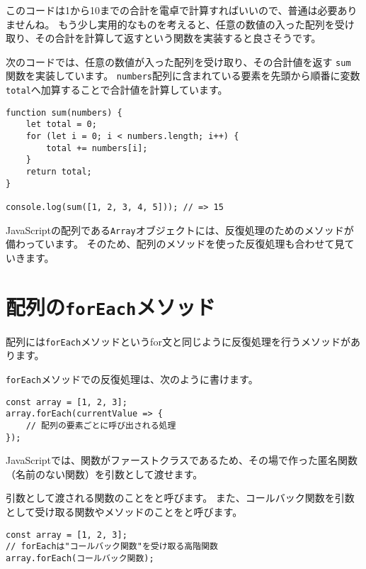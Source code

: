 このコードは1から10までの合計を電卓で計算すればいいので、普通は必要ありませんね。
もう少し実用的なものを考えると、任意の数値の入った配列を受け取り、その合計を計算して返すという関数を実装すると良さそうです。

次のコードでは、任意の数値が入った配列を受け取り、その合計値を返す
\texttt{sum} 関数を実装しています。
\texttt{numbers}配列に含まれている要素を先頭から順番に変数\texttt{total}へ加算することで合計値を計算しています。

\begin{lstlisting}
function sum(numbers) {
    let total = 0;
    for (let i = 0; i < numbers.length; i++) {
        total += numbers[i];
    }
    return total;
}

console.log(sum([1, 2, 3, 4, 5])); // => 15
\end{lstlisting}

JavaScriptの配列である\texttt{Array}オブジェクトには、反復処理のためのメソッドが備わっています。
そのため、配列のメソッドを使った反復処理も合わせて見ていきます。

\hypertarget{array-foreach}{%
\section{\texorpdfstring{配列の\texttt{forEach}メソッド}{配列のforEachメソッド}}\label{array-foreach}}

配列には\texttt{forEach}メソッドというfor文と同じように反復処理を行うメソッドがあります。

\texttt{forEach}メソッドでの反復処理は、次のように書けます。

\begin{lstlisting}
const array = [1, 2, 3];
array.forEach(currentValue => {
    // 配列の要素ごとに呼び出される処理
});
\end{lstlisting}

JavaScriptでは、関数がファーストクラスであるため、その場で作った匿名関数（名前のない関数）を引数として渡せます。

引数として渡される関数のことを\textbf{}と呼びます。
また、コールバック関数を引数として受け取る関数やメソッドのことを\textbf{}と呼びます。

\begin{lstlisting}
const array = [1, 2, 3];
// forEachは"コールバック関数"を受け取る高階関数
array.forEach(コールバック関数);
\end{lstlisting}

